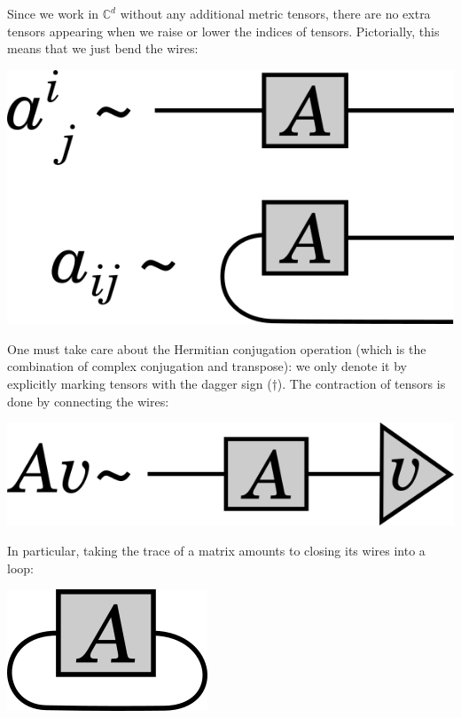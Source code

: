 Since we work in $\mathbb{C}^d$ without any additional metric tensors, there are no extra tensors appearing when we raise or lower the indices of tensors. Pictorially, this means that we just bend the wires:

\begin{center}
    \includegraphics{figures/inkscape/bend_wires.png}
\end{center}

One must take care about the Hermitian conjugation operation (which is the combination of complex conjugation and transpose): we only denote it by explicitly marking tensors with the dagger sign ($\dagger$). The contraction of tensors is done by connecting the wires:

\begin{center}
    \includegraphics{figures/inkscape/contraction.png}
\end{center}

In particular, taking the trace of a matrix amounts to closing its wires into a loop:

\begin{center}
    \includegraphics{figures/inkscape/trace.png}
\end{center}

